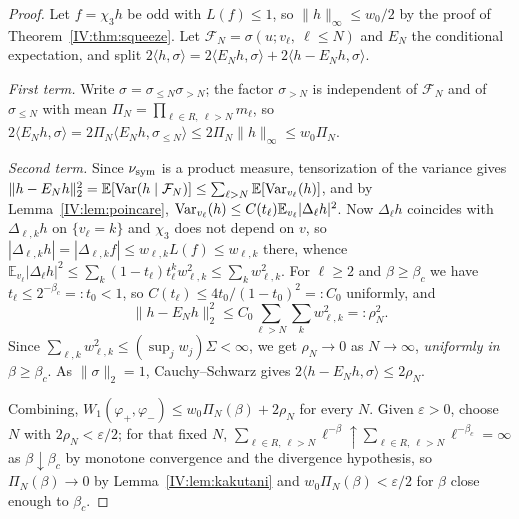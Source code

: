 \begin{proof}
Let $f=\chi_3h$ be odd with $L(f)\le1$, so $\|h\|_\infty\le w_0/2$ by the proof of
Theorem~\ref{IV:thm:squeeze}. Let $\mathcal F_N=\sigma(u;v_\ell,\ \ell\le N)$ and $E_N$ the
conditional expectation, and split
$2\langle h,\sigma\rangle=2\langle E_Nh,\sigma\rangle+2\langle h-E_Nh,\sigma\rangle$.

\emph{First term.} Write $\sigma=\sigma_{\le N}\sigma_{>N}$; the factor $\sigma_{>N}$ is
independent of $\mathcal F_N$ and of $\sigma_{\le N}$ with mean
$\Pi_N=\prod_{\ell\in R,\ \ell>N}m_\ell$, so
$2\langle E_Nh,\sigma\rangle=2\Pi_N\langle E_Nh,\sigma_{\le N}\rangle\le2\Pi_N\|h\|_\infty\le w_0\Pi_N$.

\emph{Second term.} Since $\nu_{\mathrm{sym}}$ is a product measure, tensorization of the variance gives
$\|h-E_Nh\|_2^2=\mathbb E[\operatorname{Var}(h\mid\mathcal F_N)]\le\sum_{\ell>N}\mathbb E[\operatorname{Var}_{v_\ell}(h)]$,
and by Lemma~\ref{IV:lem:poincare},
$\operatorname{Var}_{v_\ell}(h)\le C(t_\ell)\mathbb E_{v_\ell}|\Delta_\ell h|^2$. Now $\Delta_\ell h$
coincides with $\Delta_{\ell,k}h$ on $\{v_\ell=k\}$ and $\chi_3$ does not depend on $v$, so
$|\Delta_{\ell,k}h|=|\Delta_{\ell,k}f|\le w_{\ell,k}L(f)\le w_{\ell,k}$ there, whence
$\mathbb E_{v_\ell}|\Delta_\ell h|^2\le\sum_k(1-t_\ell)t_\ell^kw_{\ell,k}^2\le\sum_kw_{\ell,k}^2$.
For $\ell\ge2$ and $\beta\ge\beta_c$ we have $t_\ell\le2^{-\beta_c}=:t_0<1$, so
$C(t_\ell)\le4t_0/(1-t_0)^2=:C_0$ uniformly, and
\[
\|h-E_Nh\|_2^2\le C_0\sum_{\ell>N}\sum_{k}w_{\ell,k}^2=:\rho_N^2 .
\]
Since $\sum_{\ell,k}w_{\ell,k}^2\le(\sup_jw_j)\Sigma<\infty$, we get $\rho_N\to0$ as
$N\to\infty$, \emph{uniformly in $\beta\ge\beta_c$}. As $\|\sigma\|_2=1$, Cauchy--Schwarz
gives $2\langle h-E_Nh,\sigma\rangle\le2\rho_N$.

Combining, $W_1(\varphi_+,\varphi_-)\le w_0\Pi_N(\beta)+2\rho_N$ for every $N$. Given
$\varepsilon>0$, choose $N$ with $2\rho_N<\varepsilon/2$; for that fixed $N$,
$\sum_{\ell\in R,\ \ell>N}\ell^{-\beta}\uparrow\sum_{\ell\in R,\ \ell>N}\ell^{-\beta_c}=\infty$
as $\beta\downarrow\beta_c$ by monotone convergence and the divergence hypothesis, so
$\Pi_N(\beta)\to0$ by Lemma~\ref{IV:lem:kakutani} and $w_0\Pi_N(\beta)<\varepsilon/2$ for
$\beta$ close enough to $\beta_c$.
\end{proof}

